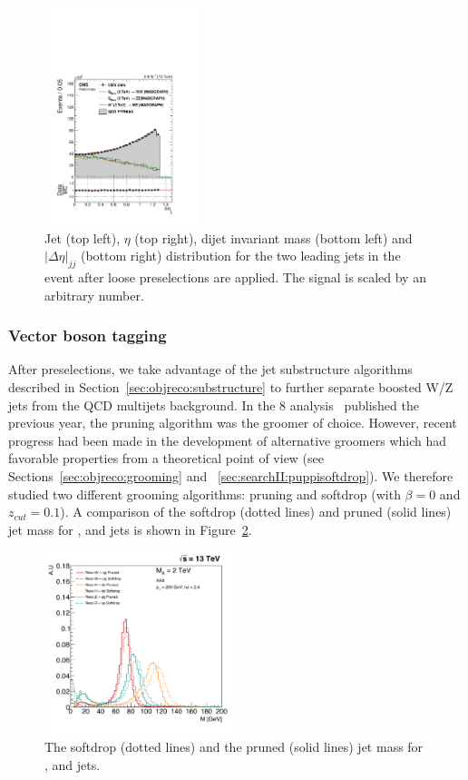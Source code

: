 \begin{figure}[h!]
\includegraphics[width=0.4\textwidth]{figures/analysis/search1/AN-15-211/controlplots/silverjson/DeltaEta_WSignal.pdf}
\caption{Jet \PT (top left), $\eta$ (top right), dijet invariant mass (bottom left) and $|\Delta \eta|_{jj}$ (bottom right) distribution for the two leading jets in the event after loose preselections are applied. The signal is scaled by an arbitrary number.}
\label{fig:kinematics-all}
\end{figure}

\subsubsection{Vector boson tagging}
\label{sec:searchI:wtagging}
After preselections, we take advantage of the jet substructure algorithms described in Section~\ref{sec:objreco:substructure} to further separate boosted W/Z jets from the QCD multijets background. In the 8 \TeV analysis~\cite{Khachatryan:1700394} published the previous year, the pruning algorithm was the groomer of choice. However, recent progress had been made in the development of alternative groomers which had favorable properties from a theoretical point of view (see Sections~\ref{sec:objreco:grooming} and ~\ref{sec:searchII:puppisoftdrop}). We therefore studied two different grooming algorithms: pruning and softdrop (with $\beta=0$ and $z_{cut} = 0.1$). A comparison of the softdrop (dotted lines) and pruned (solid lines) jet mass for \PW, \PZ and \PH jets is shown in Figure~\ref{fig:searchI:sdvspruning}.

 \begin{figure}[h!]
 \centering
 \includegraphics[width=0.49\textwidth]{figures/analysis/search1/misc/SDvsPruned.pdf}
 \caption{The softdrop (dotted lines) and the pruned (solid lines) jet mass for \PW, \PZ and \PH jets.}
 \label{fig:searchI:sdvspruning}
 \end{figure}
 
